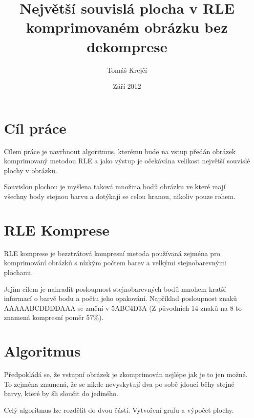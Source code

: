 \documentclass[12pt,a4paper]{article}
\title{Největší souvislá plocha v RLE komprimovaném obrázku bez dekomprese}
\author{Tomáš Krejčí}
\date{Září 2012}
\begin{document}
\maketitle

\section{Cíl práce}

Cílem práce je navrhnout algoritmus, kterému bude na vstup předán obrázek komprimovaný metodou RLE a jako výstup je očekávána velikost největší souvislé plochy v obrázku.

Souvislou plochou je myšlena taková množina bodů obrázku ve které mají všechny body stejnou barvu a dotýkají se celou hranou, nikoliv pouze rohem.

\section{RLE Komprese}

RLE komprese je bezztrátová kompresní metoda používaná zejména pro komprimování obrázků s nízkým počtem barev a velkými stejnobarevnými plochami.

Jejím cílem je nahradit posloupnost stejnobarevných bodů mnohem kratší informací o barvě bodu a počtu jeho opakování. Například posloupnost znaků AAAAABCDDDDAAA se změní v 5ABC4D3A (Z původních 14 znaků na 8 to znamená kompresní poměr 57\%).

\section{Algoritmus}

Předpokládá se, že vstupní obrázek je zkomprimován nejlépe jak je to jen možné. To zejména znamená, že se nikde nevyskytují dva po sobě jdoucí běhy stejné barvy, které by šli sloučit do jediného.

Celý algoritmus lze rozdělit do dvou částí. Vytvoření grafu a výpočet plochy.
\end{document}
